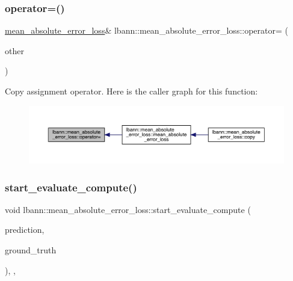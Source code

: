 \subsubsection{\texorpdfstring{operator=()}{operator=()}}
{\footnotesize\ttfamily \hyperlink{classlbann_1_1mean__absolute__error__loss}{mean\+\_\+absolute\+\_\+error\+\_\+loss}\& lbann\+::mean\+\_\+absolute\+\_\+error\+\_\+loss\+::operator= (\begin{DoxyParamCaption}\item[{const \hyperlink{classlbann_1_1mean__absolute__error__loss}{mean\+\_\+absolute\+\_\+error\+\_\+loss} \&}]{other }\end{DoxyParamCaption})\hspace{0.3cm}{\ttfamily [default]}}

Copy assignment operator. Here is the caller graph for this function\+:\nopagebreak
\begin{figure}[H]
\begin{center}
\leavevmode
\includegraphics[width=350pt]{classlbann_1_1mean__absolute__error__loss_afad15a66cbc3650767a8a1297474ac0e_icgraph}
\end{center}
\end{figure}
\mbox{\label{classlbann_1_1mean__absolute__error__loss_a6c93ac9c9dbcdec66e2a63caf25bccf9}} 
\subsubsection{\texorpdfstring{start\+\_\+evaluate\+\_\+compute()}{start\_evaluate\_compute()}}
{\footnotesize\ttfamily void lbann\+::mean\+\_\+absolute\+\_\+error\+\_\+loss\+::start\+\_\+evaluate\+\_\+compute (\begin{DoxyParamCaption}\item[{const \hyperlink{base_8hpp_a9a697a504ae84010e7439ffec862b470}{Abs\+Dist\+Mat} \&}]{prediction,  }\item[{const \hyperlink{base_8hpp_a9a697a504ae84010e7439ffec862b470}{Abs\+Dist\+Mat} \&}]{ground\+\_\+truth }\end{DoxyParamCaption})\hspace{0.3cm}{\ttfamily [inline]}, {\ttfamily [override]}, {\ttfamily [virtual]}}

